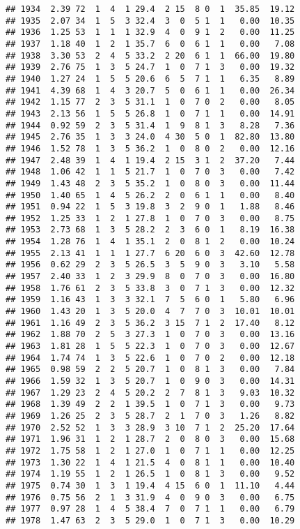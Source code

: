 \documentclass[
]{article}
\begin{document}
\begin{verbatim}
## 1934  2.39 72  1  4  1 29.4  2 15  8 0  1  35.85  19.12
## 1935  2.07 34  1  5  3 32.4  3  0  5 1  1   0.00  10.35
## 1936  1.25 53  1  1  1 32.9  4  0  9 1  2   0.00  11.25
## 1937  1.18 40  1  2  1 35.7  6  0  6 1  1   0.00   7.08
## 1938  3.30 53  2  4  5 33.2  2 20  6 1  1  66.00  19.80
## 1939  2.76 75  1  3  5 24.7  1  0  7 1  3   0.00  19.32
## 1940  1.27 24  1  5  5 20.6  6  5  7 1  1   6.35   8.89
## 1941  4.39 68  1  4  3 20.7  5  0  6 1  1   0.00  26.34
## 1942  1.15 77  2  3  5 31.1  1  0  7 0  2   0.00   8.05
## 1943  2.13 56  1  5  5 26.8  1  0  7 1  1   0.00  14.91
## 1944  0.92 59  2  3  5 31.4  1  9  8 1  3   8.28   7.36
## 1945  2.76 35  1  3  3 24.0  4 30  5 0  1  82.80  13.80
## 1946  1.52 78  1  3  5 36.2  1  0  8 0  2   0.00  12.16
## 1947  2.48 39  1  4  1 19.4  2 15  3 1  2  37.20   7.44
## 1948  1.06 42  1  1  5 21.7  1  0  7 0  3   0.00   7.42
## 1949  1.43 48  2  3  5 35.2  1  0  8 0  3   0.00  11.44
## 1950  1.40 65  1  4  5 26.2  2  0  6 1  1   0.00   8.40
## 1951  0.94 22  1  5  3 19.8  3  2  9 0  1   1.88   8.46
## 1952  1.25 33  1  2  1 27.8  1  0  7 0  3   0.00   8.75
## 1953  2.73 68  1  3  5 28.2  2  3  6 0  1   8.19  16.38
## 1954  1.28 76  1  4  1 35.1  2  0  8 1  2   0.00  10.24
## 1955  2.13 41  1  1  1 27.7  6 20  6 0  3  42.60  12.78
## 1956  0.62 29  2  3  5 26.5  3  5  9 0  3   3.10   5.58
## 1957  2.40 33  1  2  3 29.9  8  0  7 0  3   0.00  16.80
## 1958  1.76 61  2  3  5 33.8  3  0  7 1  3   0.00  12.32
## 1959  1.16 43  1  3  3 32.1  7  5  6 0  1   5.80   6.96
## 1960  1.43 20  1  3  5 20.0  4  7  7 0  3  10.01  10.01
## 1961  1.16 49  2  3  5 36.2  3 15  7 1  2  17.40   8.12
## 1962  1.88 70  2  5  3 27.3  1  0  7 0  3   0.00  13.16
## 1963  1.81 28  1  5  5 22.3  1  0  7 0  3   0.00  12.67
## 1964  1.74 74  1  3  5 22.6  1  0  7 0  2   0.00  12.18
## 1965  0.98 59  2  2  5 20.7  1  0  8 1  3   0.00   7.84
## 1966  1.59 32  1  3  5 20.7  1  0  9 0  3   0.00  14.31
## 1967  1.29 23  2  4  5 20.2  2  7  8 1  3   9.03  10.32
## 1968  1.39 49  2  2  1 39.5  1  0  7 1  3   0.00   9.73
## 1969  1.26 25  2  3  5 28.7  2  1  7 0  3   1.26   8.82
## 1970  2.52 52  1  3  3 28.9  3 10  7 1  2  25.20  17.64
## 1971  1.96 31  1  2  1 28.7  2  0  8 0  3   0.00  15.68
## 1972  1.75 58  1  2  1 27.0  1  0  7 1  1   0.00  12.25
## 1973  1.30 22  1  4  1 21.5  4  0  8 1  1   0.00  10.40
## 1974  1.19 55  1  2  1 26.5  1  0  8 1  3   0.00   9.52
## 1975  0.74 30  1  3  1 19.4  4 15  6 0  1  11.10   4.44
## 1976  0.75 56  2  1  3 31.9  4  0  9 0  3   0.00   6.75
## 1977  0.97 28  1  4  5 38.4  7  0  7 1  1   0.00   6.79
## 1978  1.47 63  2  3  5 29.0  1  0  7 1  3   0.00  10.29

\end{verbatim}
\end{document}
